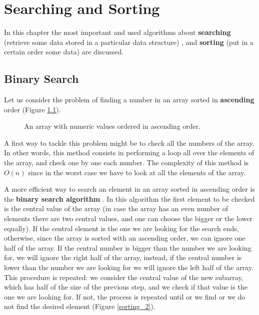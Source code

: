 \chapter{Searching and Sorting}
\label{chp: searchandsorting}
In this chapter the most important and used algorithms about \textbf{searching} (retrieve some data stored in a particular data structure) \cite{wikisearch}, and \textbf{sorting} (put in a certain order some data) \cite{wikisorting} are discussed.
\section{Binary Search}
Let us consider the problem of finding a number in an array sorted in \textbf{ascending} order (Figure \ref{sorting_1}).

\begin{figure}[H]
\centering
{}
\caption[An array with numeric values ordered in ascending order.]{An array with numeric values ordered in ascending order.}
\label{sorting_1}
\end{figure}

A first way to tackle this problem might be to check all the numbers of the array. In other words, this method consists in performing a loop all over the elements of the array, and check one by one each number. The complexity of this method is \(O(n)\) since in the worst case we have to look at all the elements of the array.

A more efficient way to search an element in an array sorted in ascending order is the \textbf{binary search algorithm} \cite{wikibinarysearch}. In this algorithm the first element to be checked is the central value of the array (in case the array has an even number of elements there are two central values, and one can choose the bigger or the lower equally). If the central element is the one we are looking for the search ends, otherwise, since the array is sorted with an ascending order, we can ignore one half of the array. If the central number is bigger than the number we are looking for, we will ignore the right half of the array, instead, if the central number is lower than the number we are looking for we will ignore the left half of the array. This procedure is repeated: we consider the central value of the new subarray, which has half of the size of the previous step, and we check if that value is the one we are looking for. If not, the process is repeated until or we find or we do not find the desired element (Figure \ref{sorting_2}).


